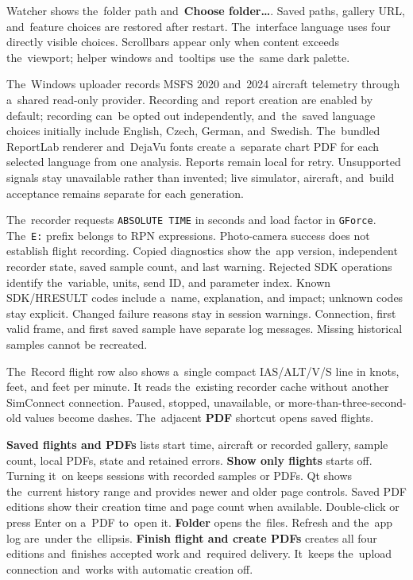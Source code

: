 \documentclass[11pt,a4paper]{article}
\newcommand{\ui}[1]{\textbf{#1}}
\begin{document}
Watcher shows the~folder path and~\ui{Choose folder…}. Saved paths,
gallery URL, and~feature choices are restored after restart. The~interface
language uses four directly visible choices. Scrollbars appear only when
content exceeds the~viewport; helper windows and~tooltips use the~same
dark palette.

The~Windows uploader records MSFS 2020 and~2024 aircraft telemetry through
a~shared read-only provider. Recording and~report creation are enabled by
default; recording can~be opted out independently, and~the~saved language
choices initially include English, Czech, German, and~Swedish. The~bundled
ReportLab renderer and~DejaVu fonts create a~separate chart PDF for each
selected language from one analysis. Reports remain local for retry.
Unsupported signals stay unavailable rather than invented; live simulator,
aircraft, and~build acceptance remains separate for each generation.

The~recorder requests \texttt{ABSOLUTE TIME} in seconds and load factor in
\texttt{GForce}. The~\texttt{E:} prefix belongs to RPN expressions.
Photo-camera success does not establish flight recording. Copied diagnostics
show the~app version, independent recorder state, saved sample count, and last
warning. Rejected SDK operations identify the~variable, units, send ID, and
parameter index. Known SDK/HRESULT codes include a~name, explanation, and
impact;
unknown codes stay explicit. Changed failure reasons stay in session warnings.
Connection, first valid frame, and first saved sample have separate log
messages.
Missing historical samples cannot be recreated.

The~Record flight row also shows a~single compact IAS/ALT/V/S line in knots,
feet, and feet per minute. It reads the~existing recorder cache without another
SimConnect connection. Paused, stopped, unavailable, or
more-than-three-second-old
values become dashes. The~adjacent \ui{PDF} shortcut opens saved flights.

\ui{Saved flights and PDFs} lists start time, aircraft or recorded gallery,
sample count, local PDFs, state and retained errors. \ui{Show only flights}
starts off. Turning it~on keeps sessions with recorded samples or PDFs.
Qt shows the~current history range and provides newer and older page controls.
Saved PDF editions show their creation time and page count when available.
Double-click or press Enter on a~PDF to~open it. \ui{Folder} opens the~files.
Refresh and the~app log are~under the~ellipsis. \ui{Finish flight and create PDFs} creates
all four editions and~finishes accepted work and~required delivery. It~keeps
the~upload connection and~works with automatic creation off.
\end{document}
